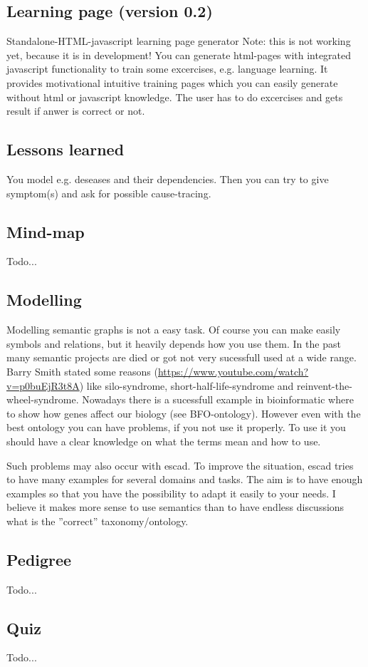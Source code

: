 \documentclass[a4paper, 12pt, openany]{scrbook}
\begin{document}
\subsection{Learning page (version 0.2)}
Standalone-HTML-javascript learning page generator Note: this is not working yet, because it is in development! You can generate html-pages with integrated javascript functionality to train some excercises, e.g. language learning. It provides motivational intuitive training pages which you can easily generate without html or javascript knowledge. The user has to do excercises and gets result if anwer is correct or not.
\subsection{Lessons learned}
 You model e.g. deseases and their dependencies. Then you can try to give symptom(s) and ask for possible cause-tracing.
\subsection{Mind-map}
Todo... 
\subsection{Modelling}
Modelling semantic graphs is not a easy task. Of course you can make easily symbols and relations, but it heavily depends how you use them. In the past many semantic projects are died or got not very sucessfull used at a wide range. Barry Smith stated some reasons (\url{https://www.youtube.com/watch?v=p0buEjR3t8A}) like silo-syndrome, short-half-life-syndrome and reinvent-the-wheel-syndrome. Nowadays there is a sucessfull example in bioinformatic where to show how genes affect our biology (see BFO-ontology). However even with the best ontology you can have problems, if you not use it properly. To use it you should have a clear knowledge on what the terms mean and how to use.

Such problems may also occur with escad. To improve the situation, escad tries to have many examples for several domains and tasks. The aim is to have enough examples so that you have the possibility to adapt it easily to your needs. I believe it makes more sense to use semantics than to have endless discussions what is the ''correct'' taxonomy/ontology.
\subsection{Pedigree}
Todo...
\subsection{Quiz}
Todo...
\end{document}
